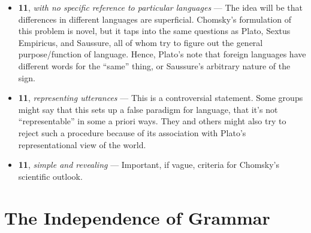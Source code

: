 \documentclass[12pt]{article}
\begin{document}
\begin{itemize}
\item \textbf{11}, \textit{with no specific reference to particular languages} --- The idea will be that differences in different languages are superficial. Chomsky's formulation of this problem is novel, but it taps into the same questions as Plato, Sextus Empiricus, and Saussure, all of whom try to figure out the general purpose/function of language. Hence, Plato's note that foreign languages have different words for the ``same'' thing, or Saussure's arbitrary nature of the sign.

\item \textbf{11}, \textit{representing utterances} --- This is a controversial statement. Some groups might say that this sets up a false paradigm for language, that it's not ``representable'' in some a priori ways. They and others might also try to reject such a procedure because of its association with Plato's representational view of the world.

\item \textbf{11}, \textit{simple and revealing} --- Important, if vague, criteria for Chomsky's scientific outlook.
 
\end{itemize}

\section{The Independence of Grammar}
\end{document}
